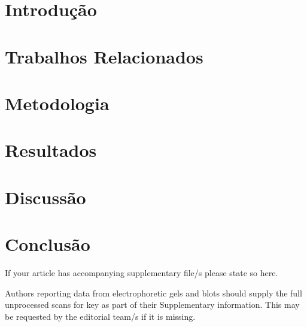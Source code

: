 \documentclass[pdflatex,sn-mathphys-num]{sn-jnl}%
\theoremstyle{thmstyleone}%
\theoremstyle{thmstyletwo}%
\theoremstyle{thmstylethree}%
\begin{document}



\maketitle

\section{Introdução}\label{sec:introduction}


\section{Trabalhos Relacionados}\label{sec:related-work}


\section{Metodologia}\label{sec:methods}


\section{Resultados}\label{sec:results}


\section{Discussão}\label{sec:discussion}


\section{Conclusão}\label{sec:conclusion}


\backmatter


If your article has accompanying supplementary file/s please state so here. 

Authors reporting data from electrophoretic gels and blots should supply the full unprocessed scans for key as part of their Supplementary information. This may be requested by the editorial team/s if it is missing.
\end{document}
